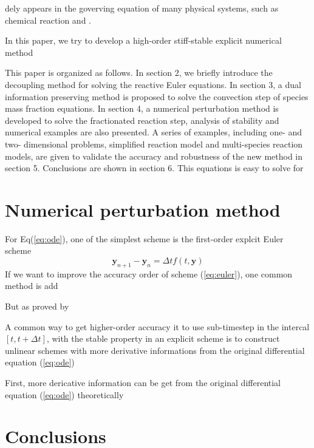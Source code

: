 \documentclass[review]{elsarticle}
\theoremstyle{plain}\newtheorem{definition}{\sc{Definition}}
\theoremstyle{defination}\newtheorem{example}{Example}[section]
\numberwithin{equation}{section}
\numberwithin{table}{section}
\begin{document}
{dely appears in  the goverving equation of many physical systems, such as chemical reaction and .  


 In this paper, we try to develop a high-order stiff-stable explicit numerical method 

This paper is organized as follows. In section 2, we briefly introduce the decoupling method for solving the reactive Euler equations. In section 3, a dual information preserving method is proposed to solve the convection step of species mass fraction equations. In section 4, a numerical perturbation method is developed to solve the fractionated reaction step, analysis of stability and numerical examples are also presented. A series of examples, including one- and two- dimensional problems, simplified reaction model and multi-species reaction models, are given to validate the accuracy and robustness of the new method in section 5. Conclusions are shown in section 6.
This equations is easy to solve for  


\section{Numerical perturbation method}

For Eq(\ref{eq:ode}), one of  the simplest scheme is the first-order explcit Euler scheme  
\begin{equation}\label{eq:euler}
  \bm{y}_{n+1}- \bm{y}_n = \Delta t f(t,\bm{y})
\end{equation}
If we want to improve the accuracy order of scheme (\ref{eq:euler}),  one common method is add 

But as proved by  

A common way to get higher-order accuracy it to use sub-timestep in the intercal $[t,t+\Delta t]$,    with the stable property in an explicit scheme  is to construct unlinear schemes with more derivative informations from the original differential equation (\ref{eq:ode}) 

First, more dericative information can be get from the original differential equation (\ref{eq:ode}) theoretically 








   



\section{Conclusions}

}
\end{document}
